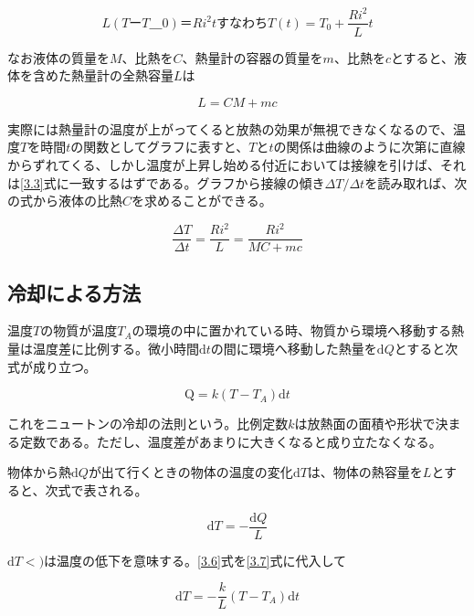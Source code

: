 \documentclass{jsarticle}
\begin{document}
\begin{equation}
\label{3.3}
	L(TーT＿0)＝Ri^{2}t すなわち T(t) = T_0 + \frac{Ri^{2}}{L}t
\end{equation}

なお液体の質量を$M$、比熱を$C$、熱量計の容器の質量を$m$、比熱を$c$とすると、液体を含めた熱量計の全熱容量$L$は

\begin{equation}
	L = CM + mc
\end{equation}

\par 実際には熱量計の温度が上がってくると放熱の効果が無視できなくなるので、温度$T$を時間$t$の関数としてグラフに表すと、$T$と$t$の関係は曲線のように次第に直線からずれてくる、しかし温度が上昇し始める付近においては接線を引けば、それは\ref{3.3}式に一致するはずである。グラフから接線の傾き$\Delta T/\Delta t$を読み取れば、次の式から液体の比熱$C$を求めることができる。

\begin{equation}
\label{5}
	\frac{\Delta T}{\Delta t} = \frac{Ri^{2}}{L} = \frac{Ri^{2}}{MC + mc}
\end{equation}

\subsection{冷却による方法}
温度$T$の物質が温度$T_A$の環境の中に置かれている時、物質から環境へ移動する熱量は温度差に比例する。微小時間$\textrm{d}t$の間に環境へ移動した熱量を$\textrm{d}Q$とすると次式が成り立つ。

\begin{equation}
\label{3.6}
	\textrm{Q} = k(T- T_A)\textrm{d}t
\end{equation}

これをニュートンの冷却の法則という。比例定数$k$は放熱面の面積や形状で決まる定数である。ただし、温度差があまりに大きくなると成り立たなくなる。\\
\par 物体から熱$\textrm{d}Q$が出て行くときの物体の温度の変化$\textrm{d}T$は、物体の熱容量を$L$とすると、次式で表される。

\begin{equation}
\label{3.7}
	\textrm{d}T = -\frac{\textrm{d}Q}{L}
\end{equation}

$\textrm{d}T<)$は温度の低下を意味する。\ref{3.6}式を\ref{3.7}式に代入して

\begin{equation}
	\textrm{d}T = -\frac{k}{L}(T-T_A)\textrm{d}t
\end{equation}
\end{document}
